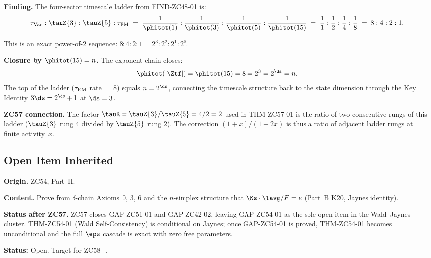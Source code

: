 \documentclass[12pt, a4paper]{article}
\begin{document}
\begin{derivedbox}[title={FIND-ZC57-02: Timescale Ladder
  $8:4:2:1=2^{\ds}:2^2:2^1:2^0$ ($R_0$, Exact)}]
\textbf{Finding.}
The four-sector timescale ladder from FIND-ZC48-01 is:
\[
  \tau_{\rm Vac}:\tauZ{3}:\tauZ{5}:\tau_{\rm EM}
  \;=\;
  \frac{1}{\phitot(1)}:\frac{1}{\phitot(3)}:
  \frac{1}{\phitot(5)}:\frac{1}{\phitot(15)}
  \;=\;
  \frac{1}{1}:\frac{1}{2}:\frac{1}{4}:\frac{1}{8}
  \;=\;
  8:4:2:1.
\]

This is an exact power-of-$2$ sequence:
$8:4:2:1 = 2^3:2^2:2^1:2^0$.

\textbf{Closure by $\phitot(15)=n$.}
The exponent chain closes:
\[
  \phitot(|\Ztf|) = \phitot(15) = 8 = 2^3 = 2^{\ds} = n.
\]
The top of the ladder ($\tau_{\rm EM}$ rate $=8$) equals $n=2^{\ds}$,
connecting the timescale structure back to the state dimension
through the Key Identity $3\ds=2^{\ds}+1$ at $\ds=3$.

\textbf{ZC57 connection.}
The factor $\tauR=\tauZ{3}/\tauZ{5}=4/2=2$ used in THM-ZC57-01
is the ratio of two consecutive rungs of this ladder
($\tauZ{3}$ rung $4$ divided by $\tauZ{5}$ rung $2$).
The correction $(1+x)/(1+2x)$ is thus a ratio of adjacent
ladder rungs at finite activity~$x$.
\end{derivedbox}

\subsection{Open Item Inherited}

\begin{openqbox}[title={GAP-ZC54-01: Jaynes K20 from Axioms
  (Inherited, Sole Remaining Open Item)}]
\textbf{Origin.} ZC54, Part~H.

\textbf{Content.}
Prove from $\delta$-chain Axioms~0, 3, 6 and the $n$-simplex
structure that $\Ks\cdot\Tavg/F = e$ (Part~B K20, Jaynes identity).

\textbf{Status after ZC57.}
ZC57 closes GAP-ZC51-01 and GAP-ZC42-02, leaving GAP-ZC54-01
as the sole open item in the Wald--Jaynes cluster.
THM-ZC54-01 (Wald Self-Consistency) is conditional on Jaynes;
once GAP-ZC54-01 is proved, THM-ZC54-01 becomes unconditional
and the full $\eps$ cascade is exact with zero free parameters.

\textbf{Status:} Open. Target for ZC58+.
\end{openqbox}
\end{document}

